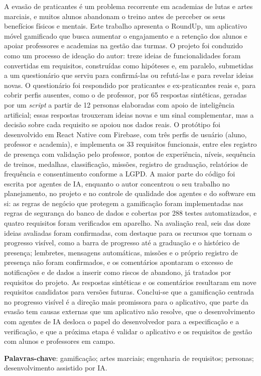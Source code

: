 \begin{resumo}
\SingleSpacing
\noindent A evasão de praticantes é um problema recorrente em academias de
lutas e artes marciais, e muitos alunos abandonam o treino antes de
perceber os seus benefícios físicos e mentais. Este trabalho apresenta o
RoundUp, um aplicativo móvel gamificado que busca aumentar o engajamento e
a retenção dos alunos e apoiar professores e academias na gestão das
turmas. O projeto foi conduzido como um processo de ideação do autor:
treze ideias de funcionalidades foram convertidas em requisitos,
construídas como hipóteses e, em paralelo, submetidas a um questionário
que serviu para confirmá-las ou refutá-las e para revelar ideias novas.
O questionário foi respondido por praticantes e ex-praticantes reais e,
para cobrir perfis ausentes, como o de professor, por 65 respostas
sintéticas, geradas por um \textit{script} a partir de 12 personas
elaboradas com apoio de inteligência artificial; essas respostas
trouxeram ideias novas e um sinal complementar, mas a decisão sobre cada
requisito se apoiou nos dados reais. O protótipo foi desenvolvido em
React Native com Firebase, com três perfis de usuário (aluno, professor e
academia), e implementa os 33 requisitos funcionais, entre eles registro
de presença com validação pelo professor, pontos de experiência, níveis,
sequência de treinos, medalhas, classificação, missões, registro de
graduação, relatórios de frequência e consentimento conforme a LGPD. A
maior parte do código foi escrita por agentes de IA, enquanto o autor
concentrou o seu trabalho no planejamento, no projeto e no controle de
qualidade dos agentes e do software em si: as regras de negócio que protegem a gamificação foram
implementadas nas regras de segurança do banco de dados e cobertas por
288 testes automatizados, e quatro requisitos foram verificados em
aparelho. Na avaliação real, seis das doze ideias avaliadas foram
confirmadas, com destaque para os recursos que tornam o progresso
visível, como a barra de progresso até a graduação e o histórico de
presença; lembretes, mensagens automáticas, missões e o próprio registro
de presença não foram confirmados, e os comentários apontaram o excesso
de notificações e de dados a inserir como riscos de abandono, já tratados
por requisitos do projeto. As respostas sintéticas e os comentários
resultaram em nove requisitos candidatos para versões futuras. Conclui-se
que a gamificação centrada no progresso visível é a direção mais
promissora para o aplicativo, que parte da evasão tem causas externas que
um aplicativo não resolve, que o desenvolvimento com agentes de IA
desloca o papel do desenvolvedor para a especificação e a verificação, e
que a próxima etapa é validar o aplicativo e os requisitos de gestão com
alunos e professores em campo.

\vspace{\onelineskip}
\noindent\textbf{Palavras-chave}: gamificação; artes marciais; engenharia de requisitos; personas; desenvolvimento assistido por IA.
\end{resumo}